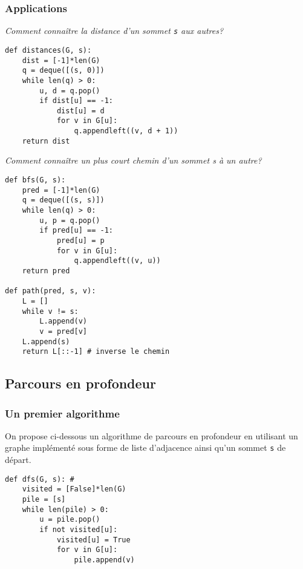 \subsubsection{Applications}
\begin{exemple}
\textit{Comment connaître la distance d’un sommet \texttt{s} aux autres?}
\begin{lstlisting}
def distances(G, s):
    dist = [-1]*len(G)
    q = deque([(s, 0)])
    while len(q) > 0:
        u, d = q.pop()
        if dist[u] == -1:
            dist[u] = d
            for v in G[u]:
                q.appendleft((v, d + 1))
    return dist
\end{lstlisting}
\end{exemple}

\begin{exemple}
\textit{Comment connaître un plus court chemin d’un sommet s à un autre?
}
\begin{lstlisting}
def bfs(G, s):
    pred = [-1]*len(G)
    q = deque([(s, s)])
    while len(q) > 0:
        u, p = q.pop()
        if pred[u] == -1:
            pred[u] = p
            for v in G[u]:
                q.appendleft((v, u))
    return pred
    
def path(pred, s, v):
    L = []
    while v != s:
        L.append(v)
        v = pred[v]
    L.append(s)
    return L[::-1] # inverse le chemin
\end{lstlisting}
\end{exemple}


\subsection{Parcours en profondeur}
\subsubsection{Un premier algorithme}

On propose ci-dessous un algorithme de parcours en profondeur en utilisant un graphe implémenté sous forme de liste d'adjacence ainsi qu'un sommet \texttt{s} de départ. 

\begin{lstlisting}
def dfs(G, s): #
    visited = [False]*len(G)
    pile = [s]
    while len(pile) > 0:
        u = pile.pop()
        if not visited[u]:
            visited[u] = True
            for v in G[u]:
                pile.append(v)
\end{lstlisting}


